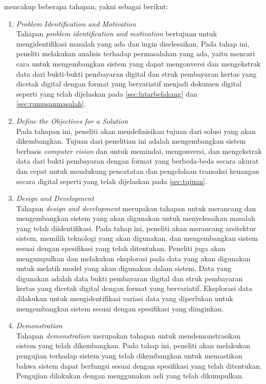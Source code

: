 \dsrm{} mencakup beberapa tahapan, yakni sebagai berikut:
\begin{enumerate}
	\item \emph{Problem Identification and Motivation}~\\
	      Tahapan \emph{problem identification and motivation} bertujuan untuk mengidentifikasi masalah yang ada dan ingin diselesaikan. Pada tahap ini, peneliti melakukan analisis terhadap permasalahan yang ada, yaitu mencari cara untuk mengembangkan sistem yang dapat mengonversi dan mengekstrak data dari bukti-bukti pembayaran digital dan struk pembayaran kertas yang dicetak digital dengan format yang bervariatif menjadi dokumen digital seperti yang telah dijelaskan pada \autoref{sec:latarbelakang} dan \autoref{sec:rumusanmasalah}.
	\item \emph{Define the Objectives for a Solution}~\\
	      Pada tahapan ini, peneliti akan mendefinisikan tujuan dari solusi yang akan dikembangkan. Tujuan dari penelitian ini adalah mengembangkan sistem berbasis \emph{computer vision} dan \dl{} untuk memindai, mengonversi, dan mengekstrak data dari bukti pembayaran dengan format yang berbeda-beda secara akurat dan cepat untuk mendukung pencatatan dan pengelolaan transaksi keuangan secara digital seperti yang telah dijelaskan pada \autoref{sec:tujuan}.
	\item \emph{Design and Development}~\\
	      Tahapan \emph{design and development} merupakan tahapan untuk merancang dan mengembangkan sistem yang akan digunakan untuk menyelesaikan masalah yang telah diidentifikasi. Pada tahap ini, peneliti akan merancang arsitektur sistem, memilih teknologi yang akan digunakan, dan mengembangkan sistem sesuai dengan spesifikasi yang telah ditentukan.	Peneliti juga akan mengumpulkan dan melakukan eksplorasi pada data yang akan digunakan untuk melatih model \dl{} yang akan digunakan dalam sistem. Data yang digunakan adalah data bukti pembayaran digital dan struk pembayaran kertas yang dicetak digital dengan format yang bervariatif. Eksplorasi data dilakukan untuk mengidentifikasi variasi data yang diperlukan untuk mengembangkan sistem sesuai dengan spesifikasi yang diinginkan.
	\item \emph{Demonstration}~\\
	      Tahapan \emph{demonstration} merupakan tahapan untuk mendemonstrasikan sistem yang telah dikembangkan. Pada tahap ini, peneliti akan melakukan pengujian terhadap sistem yang telah dikembangkan untuk memastikan bahwa sistem dapat berfungsi sesuai dengan spesifikasi yang telah ditentukan. Pengujian dilakukan dengan menggunakan \dataset{} asli yang telah dikumpulkan.

\end{enumerate}
